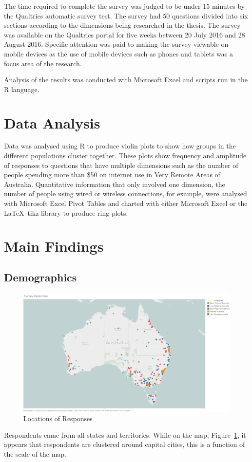 The time required to complete the survey was judged to be under 15 minutes by the Qualtrics automatic survey test. The survey had 50 questions divided into six sections according to the dimensions being researched in the thesis. The survey was available on the Qualtrics portal for five weeks between 20 July 2016 and 28 August 2016. Specific attention was paid to making the survey viewable on mobile devices as the use of mobile devices such as phones and tablets was a focus area of the research.

Analysis of the results was conducted with Microsoft Excel and scripts run in the R language. 


\section{Data Analysis}
Data was analysed using R to produce violin plots to show how groups in the different populations cluster together. These plots show frequency and amplitude of responses to questions that have multiple dimensions such as the number of people spending more than \$50 on internet use in Very Remote Areas of Australia. Quantitative information that only involved one dimension, the number of people using wired or wireless connections, for example, were analysed with Microsoft Excel Pivot Tables and charted with either Microsoft Excel or the \LaTeX ~tikz library to produce ring plots.


\section{Main Findings}
\subsection{Demographics}
\begin{figure}
\centering
\includegraphics[scale=0.40]{figures/SurveyResponses.png} 
\caption{Locations of Responses}
\label{fig:ResponsesMap}
\end{figure}
Respondents came from all states and territories. While on the map, Figure~\ref{fig:ResponsesMap}, it appears that respondents are clustered around capital cities, this is a function of the scale of the map.



